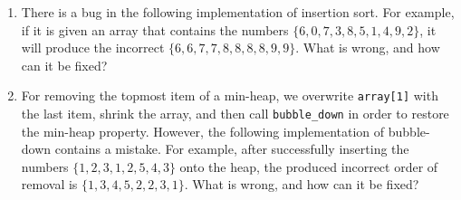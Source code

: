\documentclass[a4paper]{article}
\begin{document}
\begin{enumerate}
  
\item
  There is a bug in the following implementation of insertion sort.
  For example, if it is given an array that contains the numbers $\{ 6, 0, 7, 3, 8, 5, 1, 4, 9, 2 \}$, it will produce the incorrect $\{ 6, 6, 7, 7, 8, 8, 8, 8, 9, 9 \}$.
  What is wrong, and how can it be fixed?
  
  \begin{center}
  \end{center}
  
\item
  For removing the topmost item of a min-heap, we overwrite \texttt{array[1]} with the last item, shrink the array, and then call \texttt{bubble\_down} in order to restore the min-heap property.
  However, the following implementation of bubble-down contains a mistake.
  For example, after successfully inserting the numbers $\{ 1, 2, 3, 1, 2, 5, 4, 3 \}$ onto the heap, the produced incorrect order of removal is $\{ 1, 3, 4, 5, 2, 2, 3, 1 \}$.
  What is wrong, and how can it be fixed?
  
  \begin{center}
  \end{center}

\end{enumerate}
\end{document}
